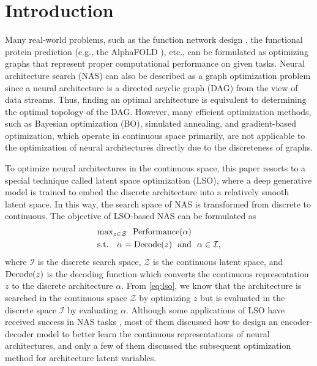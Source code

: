 \documentclass[10pt,twocolumn,letterpaper]{article}
\begin{document}
\section{Introduction}
\label{sec:intro}
Many real-world problems, such as the function network design \cite{DBLP:conf/nips/AstudilloF21}, the functional protein prediction (e.g., the AlphaFOLD \cite{jumper2021highly}), etc., can be formulated as optimizing graphs that represent proper computational performance on given tasks. Neural architecture search (NAS) can also be described as a graph optimization problem since a neural architecture is a directed acyclic graph (DAG) from the view of data streams. Thus, finding an optimal architecture is equivalent to determining the optimal topology of the DAG. However, many efficient optimization methods, such as Bayesian optimization (BO), simulated annealing, and gradient-based optimization, which operate in continuous space primarily, are not applicable to the optimization of neural architectures directly due to the discreteness of graphs.

To optimize neural architectures in the continuous space, this paper resorts to a special technique called latent space optimization (LSO), where a deep generative model is trained to embed the discrete architecture into a relatively smooth latent space. In this way, the search space of NAS is transformed from discrete to continuous. The objective of LSO-based NAS can be formulated as  
\begin{align}
	\label{eq:lso}
	\begin{split}
		& {\rm max}_{z\in \mathcal{Z}} \ \ {\rm Performance} (\alpha) \\
		& {\rm s.t.} \ \ \ \alpha = {\rm Decode}(z) \ \ {\rm and} \ \ \alpha \in \mathcal{I},
	\end{split}
\end{align}
where $\mathcal{I}$ is the discrete search space, $\mathcal{Z}$ is the continuous latent space, and ${\rm Decode}(z)$ is the decoding function which converts the continuous representation $z$ to the discrete architecture $\alpha$. From \eqref{eq:lso}, we know that the architecture is searched in the continuous space $\mathcal{Z}$ by optimizing $z$ but is evaluated in the discrete space $\mathcal{I}$ by evaluating $\alpha$. Although some applications of LSO have received success in NAS tasks \cite{luo2018neural, DBLP:conf/nips/ZhangJCGC19, chatzianastasis2021graph}, most of them discussed how to design an encoder-decoder model to better learn the continuous representations of neural architectures, and only a few of them discussed the subsequent optimization method for architecture latent variables. 
\end{document}
